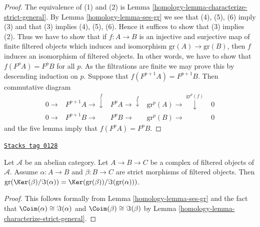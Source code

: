 \begin{proof}

The equivalence of (1) and (2) is
Lemma \ref{homology-lemma-characterize-strict-general}.
By
Lemma \ref{homology-lemma-ses-gr}
we see that (4), (5), (6) imply (3) and that (3) implies (4), (5), (6).
Hence it suffices to show that (3) implies (2).
Thus we have to show that if $f : A \to B$ is an injective and surjective
map of finite filtered objects which induces and isomorphism
$\text{gr}(A) \to \text{gr}(B)$, then $f$ induces an isomorphism of
filtered objects. In other words, we have to show that
$f(F^pA) = F^pB$ for all $p$.
As the filtrations are finite we may prove this by descending induction
on $p$. Suppose that $f(F^{p + 1}A) = F^{p + 1}B$.
Then commutative diagram
$$
\begin{array}{ccccc}0 \longrightarrow & F^{p + 1}A \longrightarrow\overset{f}{\downarrow} & F^pA \longrightarrow\overset{f}{\downarrow} & \text{gr}^p(A) \longrightarrow\overset{\text{gr}^p(f)}{\downarrow} & 0 \\ 0 \longrightarrow & F^{p + 1}B \longrightarrow & F^pB \longrightarrow & \text{gr}^p(B) \longrightarrow & 0\end{array}
$$
and the five lemma imply that $f(F^pA) = F^pB$.
\end{proof}

\begin{lemma}
\label{homology-lemma-filtered-complex}
\href{https://stacks.math.columbia.edu/tag/0128}{\texttt{Stacks tag 0128}}

Let $\mathcal{A}$ be an abelian category. Let $A \to B \to C$ be a complex
of filtered objects of $\mathcal{A}$. Assume $\alpha : A \to B$ and
$\beta : B \to C$ are strict morphisms of filtered objects. Then
$\text{gr}(\Ker(\beta)/\Im(\alpha)) =
\Ker(\text{gr}(\beta))/\Im(\text{gr}(\alpha)))$.
\end{lemma}

\begin{proof}

This follows formally from
Lemma \ref{homology-lemma-ses-gr}
and the fact that
$\Coim(\alpha) \cong \Im(\alpha)$ and
$\Coim(\beta) \cong \Im(\beta)$ by
Lemma \ref{homology-lemma-characterize-strict-general}.
\end{proof}

